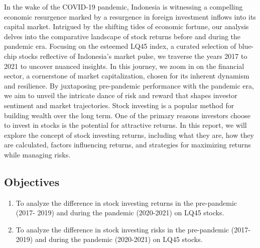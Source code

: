 \par

In the wake of the COVID-19 pandemic, Indonesia is witnessing a compelling economic resurgence marked by a resurgence in foreign investment inflows into its capital market.
Intrigued by the shifting tides of economic fortune, our analysis delves into the comparative landscape of stock returns before and during the pandemic era. Focusing on the esteemed LQ45 index, a curated selection of blue-chip stocks reflective of Indonesia's market pulse, we traverse the years 2017 to 2021 to uncover nuanced insights.
In this journey, we zoom in on the financial sector, a cornerstone of market capitalization, chosen for its inherent dynamism and resilience. By juxtaposing pre-pandemic performance with the pandemic era, we aim to unveil the intricate dance of risk and reward that shapes investor sentiment and market trajectories.
Stock investing is a popular method for building wealth over the long term. One of the primary reasons investors choose to invest in stocks is the potential for attractive returns. In this report, we will explore the concept of stock investing returns, including what they are, how they are calculated, factors influencing returns, and strategies for maximizing returns while managing risks.

\subsection{Objectives}
\begin{enumerate}
    \item To analyze the difference in stock investing returns in the pre-pandemic (2017-
2019) and during the pandemic (2020-2021) on LQ45 stocks.
    \item To analyze the difference in stock investing risks in the pre-pandemic (2017-
2019) and during the pandemic (2020-2021) on LQ45 stocks.
\end{enumerate}

